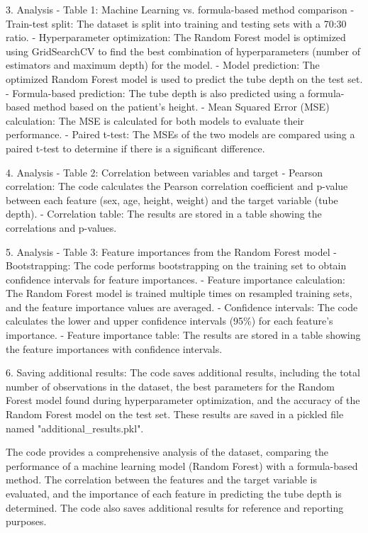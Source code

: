 \documentclass[11pt]{article}
\begin{document}
3. Analysis - Table 1: Machine Learning vs. formula-based method comparison
   - Train-test split: The dataset is split into training and testing sets with a 70:30 ratio.
   - Hyperparameter optimization: The Random Forest model is optimized using GridSearchCV to find the best combination of hyperparameters (number of estimators and maximum depth) for the model.
   - Model prediction: The optimized Random Forest model is used to predict the tube depth on the test set.
   - Formula-based prediction: The tube depth is also predicted using a formula-based method based on the patient's height.
   - Mean Squared Error (MSE) calculation: The MSE is calculated for both models to evaluate their performance.
   - Paired t-test: The MSEs of the two models are compared using a paired t-test to determine if there is a significant difference.

4. Analysis - Table 2: Correlation between variables and target
   - Pearson correlation: The code calculates the Pearson correlation coefficient and p-value between each feature (sex, age, height, weight) and the target variable (tube depth).
   - Correlation table: The results are stored in a table showing the correlations and p-values.

5. Analysis - Table 3: Feature importances from the Random Forest model
   - Bootstrapping: The code performs bootstrapping on the training set to obtain confidence intervals for feature importances.
   - Feature importance calculation: The Random Forest model is trained multiple times on resampled training sets, and the feature importance values are averaged.
   - Confidence intervals: The code calculates the lower and upper confidence intervals (95\%) for each feature's importance.
   - Feature importance table: The results are stored in a table showing the feature importances with confidence intervals.

6. Saving additional results: The code saves additional results, including the total number of observations in the dataset, the best parameters for the Random Forest model found during hyperparameter optimization, and the accuracy of the Random Forest model on the test set. These results are saved in a pickled file named "additional\_results.pkl".

The code provides a comprehensive analysis of the dataset, comparing the performance of a machine learning model (Random Forest) with a formula-based method. The correlation between the features and the target variable is evaluated, and the importance of each feature in predicting the tube depth is determined. The code also saves additional results for reference and reporting purposes.
\end{document}
